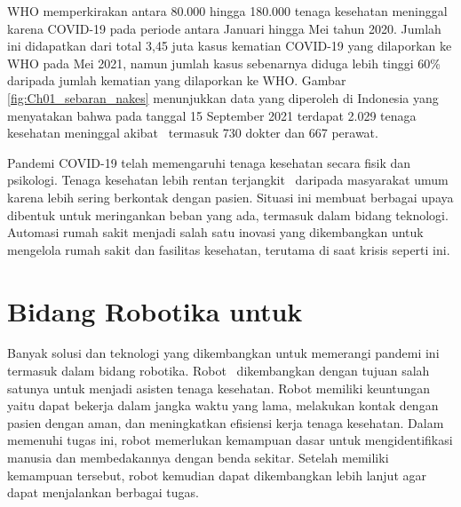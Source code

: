 WHO memperkirakan antara 80.000 hingga 180.000 tenaga kesehatan meninggal karena COVID-19 pada periode antara Januari hingga Mei tahun 2020\cite{a5}. Jumlah ini didapatkan dari total 3,45 juta kasus kematian COVID-19 yang dilaporkan ke WHO pada Mei 2021, namun jumlah kasus sebenarnya diduga lebih tinggi 60\% daripada jumlah kematian yang dilaporkan ke WHO. Gambar \ref{fig:Ch01_sebaran_nakes} menunjukkan data yang diperoleh di Indonesia yang menyatakan bahwa pada tanggal 15 September 2021 terdapat 2.029 tenaga kesehatan meninggal akibat \covid\ termasuk 730 dokter dan 667 perawat\cite{a6}.

Pandemi COVID-19 telah memengaruhi tenaga kesehatan secara fisik dan psikologi\cite{a7}.
Tenaga kesehatan lebih rentan terjangkit \covid\ daripada masyarakat umum karena lebih sering berkontak dengan pasien. Situasi ini membuat berbagai upaya dibentuk untuk meringankan beban yang ada, termasuk dalam bidang teknologi. Automasi rumah sakit menjadi salah satu inovasi yang dikembangkan untuk mengelola rumah sakit dan fasilitas kesehatan, terutama di saat krisis seperti ini.




\section{Bidang Robotika untuk \covid}
\label{sec:Robotika_covid}
Banyak solusi dan teknologi yang dikembangkan untuk memerangi pandemi ini termasuk dalam bidang robotika. Robot \covid\ dikembangkan dengan tujuan salah satunya untuk menjadi asisten tenaga kesehatan. Robot memiliki keuntungan yaitu dapat bekerja dalam jangka waktu yang lama, melakukan kontak dengan pasien dengan aman, dan meningkatkan efisiensi kerja tenaga kesehatan. Dalam memenuhi tugas ini, robot memerlukan kemampuan dasar untuk mengidentifikasi manusia dan membedakannya dengan benda sekitar. Setelah memiliki kemampuan tersebut, robot kemudian dapat dikembangkan lebih lanjut agar dapat menjalankan berbagai tugas.

